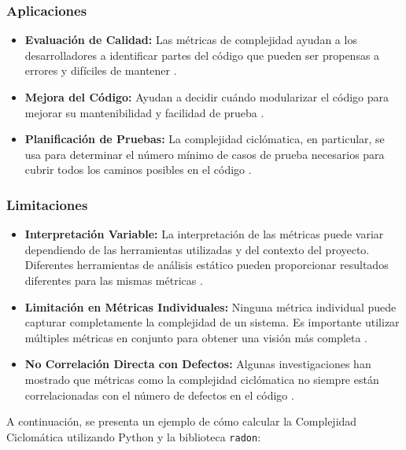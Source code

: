 \documentclass[a4,10pt]{article}
\begin{document}
\subsubsection{Aplicaciones}
\begin{itemize}
    \item \textbf{Evaluación de Calidad:} Las métricas de complejidad ayudan a los desarrolladores a identificar partes del código que pueden ser propensas a errores y difíciles de mantener \cite{ebert2016}.
    \item \textbf{Mejora del Código:} Ayudan a decidir cuándo modularizar el código para mejorar su mantenibilidad y facilidad de prueba \cite{:/content/journals/10.1049/sej.1994.0014}.
    \item \textbf{Planificación de Pruebas:} La complejidad ciclómatica, en particular, se usa para determinar el número mínimo de casos de prueba necesarios para cubrir todos los caminos posibles en el código \cite{odeh2023}.
\end{itemize}

\subsubsection{Limitaciones}
\begin{itemize}
    \item \textbf{Interpretación Variable:} La interpretación de las métricas puede variar dependiendo de las herramientas utilizadas y del contexto del proyecto. Diferentes herramientas de análisis estático pueden proporcionar resultados diferentes para las mismas métricas \cite{wijendra2021}.
    \item \textbf{Limitación en Métricas Individuales:} Ninguna métrica individual puede capturar completamente la complejidad de un sistema. Es importante utilizar múltiples métricas en conjunto para obtener una visión más completa .
    \item \textbf{No Correlación Directa con Defectos:} Algunas investigaciones han mostrado que métricas como la complejidad ciclómatica no siempre están correlacionadas con el número de defectos en el código \cite{odeh2023}.
\end{itemize}

A continuación, se presenta un ejemplo de cómo calcular la Complejidad Ciclomática utilizando Python y la biblioteca \texttt{radon}:
\end{document}
